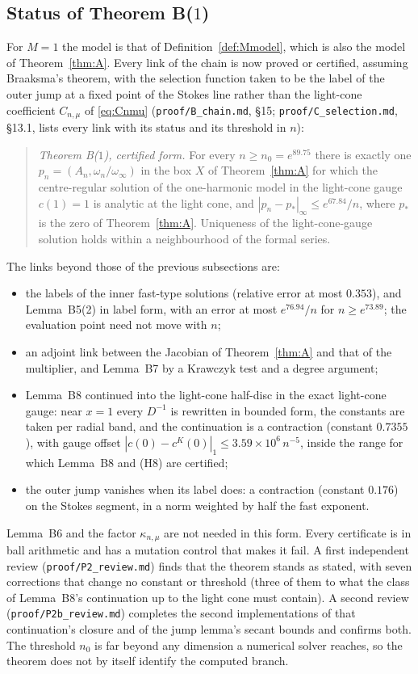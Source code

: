 \documentclass{amsart}
\numberwithin{equation}{section}
\theoremstyle{plain}
\theoremstyle{definition}
\theoremstyle{remark}
\newcommand{\repo}[1]{\texttt{#1}}
\begin{document}
\subsection{Status of Theorem B(\texorpdfstring{$1$}{1})}
\label{sec:B1status}
For $M = 1$ the model is that of Definition~\ref{def:Mmodel}, which is also the model of Theorem~\ref{thm:A}. Every link of
the chain is now proved or certified, assuming Braaksma's theorem, with the selection function taken to be the label of the
outer jump at a fixed point of the Stokes line rather than the light-cone coefficient $C_{n,\mu}$ of \eqref{eq:Cnmu}
(\repo{proof/B\_chain.md}, \S15; \repo{proof/C\_selection.md}, \S13.1, lists every link with its status and its threshold in $n$):

\begin{quote}
\emph{Theorem B($1$), certified form.} For every $n \ge n_0 = e^{89.75}$ there is exactly one $p_n = (A_n, \omega_n/\omega_\infty)$
in the box $X$ of Theorem~\ref{thm:A} for which the centre-regular solution of the one-harmonic model in the light-cone gauge
$c(1) = 1$ is analytic at the light cone, and $|p_n - p_*|_\infty \le e^{67.84}/n$, where $p_*$ is the zero of
Theorem~\ref{thm:A}. Uniqueness of the light-cone-gauge solution holds within a neighbourhood of the formal series.
\end{quote}

The links beyond those of the previous subsections are:
\begin{itemize}
\item the labels of the inner fast-type solutions (relative error at most $0.353$), and Lemma~B5(2) in label form, with an
error at most $e^{76.94}/n$ for $n \ge e^{73.89}$; the evaluation point need not move with $n$;
\item an adjoint link between the Jacobian of Theorem~\ref{thm:A} and that of the multiplier, and Lemma~B7 by a Krawczyk test
and a degree argument;
\item Lemma~B8 continued into the light-cone half-disc in the exact light-cone gauge: near $x = 1$ every $D^{-1}$ is rewritten
in bounded form, the constants are taken per radial band, and the continuation is a contraction (constant $0.7355$), with
gauge offset $|c(0) - c^K(0)|_1 \le 3.59\times10^{6}\,n^{-5}$, inside the range for which Lemma~B8 and (H8) are certified;
\item the outer jump vanishes when its label does: a contraction (constant $0.176$) on the Stokes segment, in a norm weighted by
half the fast exponent.
\end{itemize}
Lemma~B6 and the factor $\kappa_{n,\mu}$ are not needed in this form. Every certificate is in ball arithmetic and has a mutation control that makes it
fail. A first independent review (\repo{proof/P2\_review.md}) finds that the theorem stands as stated, with seven
corrections that change no constant or threshold (three of them to what the class of Lemma~B8's continuation up to the
light cone must contain). A second review (\repo{proof/P2b\_review.md}) completes the second implementations of that
continuation's closure and of the jump lemma's secant bounds and confirms both. The threshold $n_0$ is far beyond any
dimension a numerical solver reaches, so the theorem does not by
itself identify the computed branch.
\end{document}
